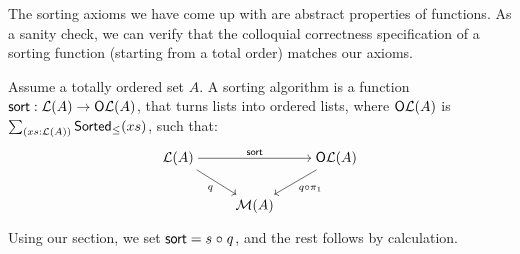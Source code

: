 The sorting axioms we have come up with are abstract properties of functions.
%
As a sanity check, we can verify that the colloquial correctness specification of a sorting function (starting from a
total order) matches our axioms.
%
\begin{proposition}
    \label{prop:sort-correctness}
    Assume a totally ordered set $A$.
    A sorting algorithm is a function $\operatorname{\mathsf{sort}} : \mathcal{L}(A) \to \mathsf{O}\mathcal{L}(A)$,
    that turns lists into ordered lists,
    where $\mathsf{O}\mathcal{L}(A)$ is $\dsum{xs : \LL(A)}{\term{Sorted}_{\leq}(xs)}$,
    such that:
    \[\begin{tikzcd}[ampersand replacement=\&,cramped]
            {\LL(A)} \&\& {\type{O}\LL(A)} \\
            \& {\MM(A)}
            \arrow["{\term{sort}}", from=1-1, to=1-3]
            \arrow["q"', from=1-1, to=2-2]
            \arrow["{q \comp \pi_1}", from=1-3, to=2-2]
        \end{tikzcd}\]
\end{proposition}
\begin{proofsketch}
    Using our section, we set $\operatorname{\mathsf{sort}} = s \mathrel{\circ} q$, and the rest follows by calculation.
\end{proofsketch}